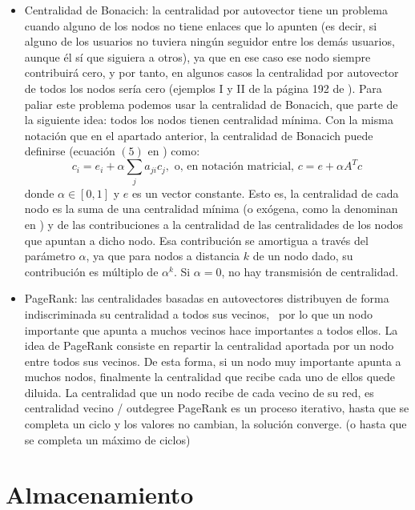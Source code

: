 \begin{itemize}
\item Centralidad de Bonacich: la centralidad por autovector tiene un problema cuando
alguno de los nodos no tiene enlaces que lo apunten (es decir, si alguno de los usuarios
no tuviera ningún seguidor entre los demás usuarios, aunque él sí que siguiera a otros),
ya que en ese caso ese nodo siempre contribuirá cero, y por tanto, en algunos casos
la centralidad por autovector de todos los nodos sería cero (ejemplos I y II de la página
192 de \cite{bonacich}). Para
paliar este problema podemos usar la centralidad de Bonacich, que  parte de la siguiente
idea: todos los nodos tienen centralidad mínima. Con la misma notación que en el apartado
anterior, la centralidad de Bonacich puede definirse 
(ecuación $(5)$ en \cite{bonacich}) como:
$$c_i = e_i + \alpha\sum_j a_{ji} c_j, \mbox{ o, en notación matricial, } c = e + \alpha A^Tc$$
donde $\alpha\in[0,1]$ y $e$ es un vector constante. Esto es, la centralidad de cada nodo es la suma
de una centralidad mínima (o exógena, como la denominan en \cite{bonacich}) 
y de las contribuciones a la centralidad de las centralidades de los nodos que apuntan 
a dicho nodo. Esa contribución se amortigua a través del parámetro $\alpha$, 
ya que para nodos a distancia $k$ de un nodo dado, su contribución es múltiplo de
$\alpha^k$. Si $\alpha=0$, no hay transmisión de centralidad.
\item PageRank: las centralidades basadas en autovectores distribuyen de forma indiscriminada 
su centralidad a todos sus vecinos,  por lo que un nodo importante que apunta a 
muchos vecinos hace importantes a todos ellos. La idea de PageRank consiste en 
repartir la centralidad aportada por un nodo entre todos sus vecinos. De esta forma, si un nodo muy importante apunta a muchos 
nodos, finalmente la centralidad que recibe cada uno de ellos quede diluida.
La centralidad que un nodo recibe de cada vecino de su red, es 
centralidad vecino / outdegree
PageRank es un proceso iterativo, hasta que se completa un ciclo y los valores no 
cambian, la solución converge. (o hasta que se completa un máximo de ciclos)
\end{itemize}


\section{Almacenamiento}